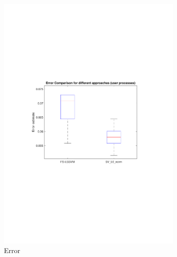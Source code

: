 \documentclass{article}
\begin{document}
\begin{figure}[h]
\begin{subfigure}[b]{0.3\textwidth}
                 \includegraphics[width=\textwidth]{Assignment 3/figures/1_3/error_comparison.pdf}
                 \caption{Error}
                 \label{fig:l0error}
             \end{subfigure}
             \hfill
             \begin{subfigure}[b]{0.3\textwidth}
                 \centering

\end{subfigure}
\end{figure}
\end{document}
